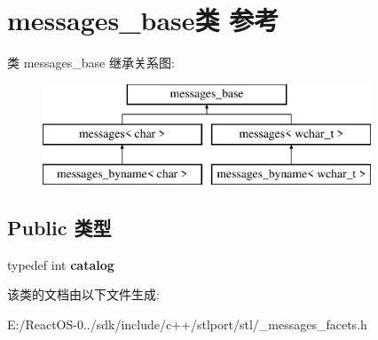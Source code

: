 \hypertarget{classmessages__base}{}\section{messages\+\_\+base类 参考}
\label{classmessages__base}
类 messages\+\_\+base 继承关系图\+:\begin{figure}[H]
\begin{center}
\leavevmode
\includegraphics[height=3.000000cm]{classmessages__base}
\end{center}
\end{figure}
\subsection*{Public 类型}
\begin{DoxyCompactItemize}
\item 
\mbox{\label{classmessages__base_a9b1c0535c27698340af2d278e65531d7}} 
typedef int {\bfseries catalog}
\end{DoxyCompactItemize}


该类的文档由以下文件生成\+:\begin{DoxyCompactItemize}
\item 
E\+:/\+React\+O\+S-\/0../sdk/include/c++/stlport/stl/\+\_\+messages\+\_\+facets.\+h\end{DoxyCompactItemize}
